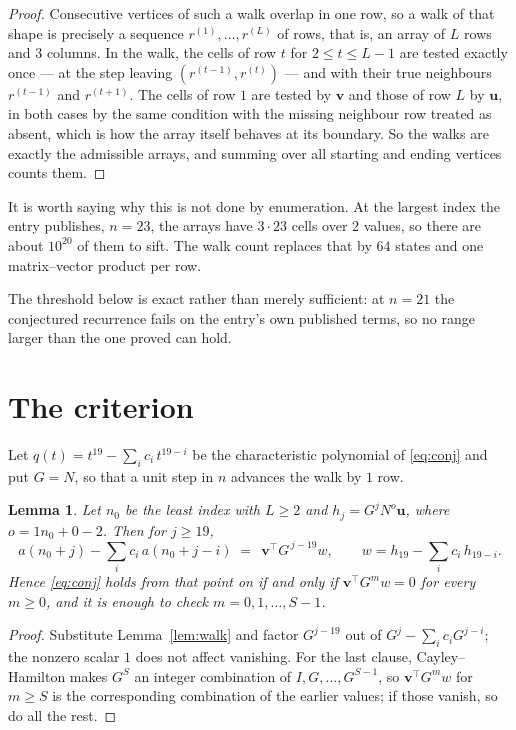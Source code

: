 \documentclass[11pt,a4paper]{article}
\theoremstyle{plain}
\newtheorem{lemma}[theorem]{Lemma}
\theoremstyle{definition}
\begin{document}
\begin{proof}
Consecutive vertices of such a walk overlap in one row, so a walk of that shape is
precisely a sequence $r^{(1)},\dots,r^{(L)}$ of rows, that is, an array of $L$ rows
and $3$ columns. In the walk, the cells of row $t$ for $2\le t\le L-1$ are tested
exactly once --- at the step leaving $(r^{(t-1)},r^{(t)})$ --- and with their true
neighbours $r^{(t-1)}$ and $r^{(t+1)}$. The cells of row $1$ are tested by
$\mathbf{v}$ and those of row $L$ by $\mathbf{u}$, in both cases by the same condition
with the missing neighbour row treated as absent, which is how the array itself behaves at
its boundary. So the walks are exactly the admissible arrays, and summing over all starting
and ending vertices counts them.
\end{proof}


It is worth saying why this is not done by enumeration. At the largest index the entry
publishes, $n=23$, the arrays have $3\cdot23$ cells over
$2$ values, so there are about $10^{20}$ of them to sift. The
walk count replaces that by $64$ states and one matrix--vector product per row.

The threshold below is exact rather than merely sufficient: at $n=21$ the conjectured
recurrence fails on the entry's own published terms, so no range larger than the one proved
can hold.
\section{The criterion}

Let $q(t)=t^{19}-\sum_i c_i\,t^{19-i}$ be the characteristic polynomial of
\eqref{eq:conj} and put $G=N$, so that a unit step in $n$ advances the walk by
$1$ row.

\begin{lemma}\label{lem:crit}
Let $n_0$ be the least index with $L\ge2$ and $h_j=G^{j}N^{o}\mathbf{u}$, where
$o=1n_0+0-2$. Then for $j\ge19$,
\[
a(n_0+j)-\sum_i c_i\,a(n_0+j-i)\;=\;\,\mathbf{v}^{\!\top}G^{\,j-19}w,
\qquad w=h_{19}-\sum_i c_i\,h_{19-i} .
\]
Hence \eqref{eq:conj} holds from that point on if and only if
$\mathbf{v}^{\!\top}G^{m}w=0$ for every $m\ge0$, and it is enough to check
$m=0,1,\dots,S-1$.
\end{lemma}

\begin{proof}
Substitute Lemma~\ref{lem:walk} and factor $G^{j-19}$ out of
$G^{j}-\sum_ic_iG^{j-i}$; the nonzero scalar $1$ does not affect
vanishing. For the last clause, Cayley--Hamilton makes $G^{S}$ an integer combination of
$I,G,\dots,G^{S-1}$, so $\mathbf{v}^{\!\top}G^{m}w$ for $m\ge S$ is the corresponding
combination of the earlier values; if those vanish, so do all the rest.
\end{proof}
\end{document}
